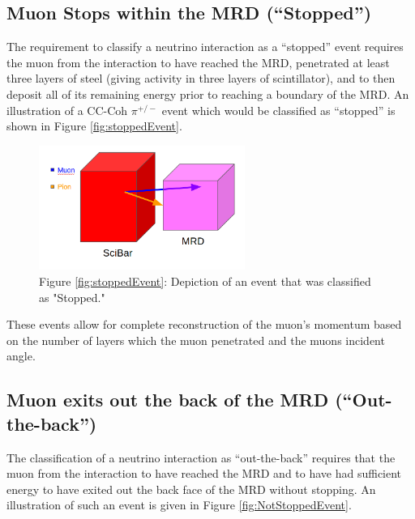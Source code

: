 \documentclass[11pt]{article}
\begin{document}
\subsection{Muon Stops within the MRD (``Stopped'')}\label{subsec:stoppedMRD}
The requirement to classify a neutrino interaction as a ``stopped'' event requires the muon from the interaction to have reached the MRD, penetrated at least three layers of steel (giving activity in three layers of scintillator), and to then deposit all of its remaining energy prior to reaching a boundary of the MRD. An illustration of a CC-Coh $\pi^{+/-}$ event which would be classified as ``stopped'' is shown in Figure \ref*{fig:stoppedEvent}.

\begin{figure}[H]
\centering
\includegraphics[width=0.6\textwidth]{EventClassifications/Stopped.png}
\caption*{Figure \ref*{fig:stoppedEvent}: Depiction of an event that was classified as "Stopped."}
\end{figure}\label{fig:stoppedEvent}

These events allow for complete reconstruction of the muon's momentum based on the number of layers which the muon penetrated and the muons incident angle.

\subsection{Muon exits out the back of the MRD (``Out-the-back'')}
The classification of a neutrino interaction as ``out-the-back'' requires that the muon from the interaction to have reached the MRD and to have had sufficient energy to have exited out the back face of the MRD without stopping. An illustration of such an event is given in Figure \ref*{fig:NotStoppedEvent}. 
\end{document}
